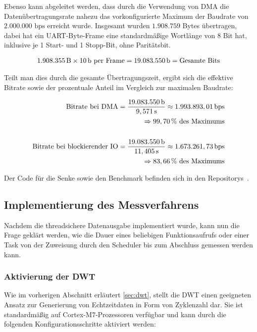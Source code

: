 Ebenso kann abgeleitet werden, dass durch die Verwendung von DMA die
Datenübertragungsrate nahezu das vorkonfigurierte Maximum der Baudrate von
$2.000.000\text{ bps}$ erreicht wurde. Insgesamt wurden $1.908.759$ Bytes
übertragen, dabei hat ein UART-Byte-Frame eine standardmäßige Wortlänge von 8
Bit hat, inklusive je 1 Start- und 1 Stopp-Bit, ohne Paritätsbit.

\begin{align*}
    1.908.355\text{\,B} \times 10\text{\,b per Frame} =
    19.083.550 \text{\,b} = \text{Gesamte Bits}
\end{align*}

Teilt man dies durch die gesamte Übertragungszeit, ergibt sich die effektive
Bitrate sowie der prozentuale Anteil im Vergleich zur maximalen Baudrate:

\begin{align*}
    \text{Bitrate bei DMA} =
    \frac{19.083.550\text{\,b}}{9,571\text{\,s}} \approx
    1.993.893,01 \text{\,bps} \\
    \quad \Rightarrow 99,70\,\%\text{ des Maximums} \\
    \\
    \text{Bitrate bei blockierender IO} =
    \frac{19.083.550\text{\,b}}{11,405\text{\,s}} \approx
    1.673.261,73 \text{\,bps} \\
    \quad \Rightarrow 83,66\,\% \text{ des Maximums}
\end{align*}

Der Code für die Senke sowie den Benchmark befinden sich in den
Repositorys~\cite{freertos_threadsafe_sink, freertos_tsink_benchmark}.

\subsection{Implementierung des Messverfahrens}

Nachdem die threadsichere Datenausgabe implementiert wurde, kann nun die Frage
geklärt werden, wie die Dauer eines beliebigen Funktionsaufrufs oder einer Task
von der Zuweisung durch den Scheduler bis zum Abschluss gemessen werden kann.

\subsubsection{Aktivierung der DWT}

Wie im vorherigen Abschnitt erläutert \ref{sec:dwt}, stellt die DWT einen
geeigneten Ansatz zur Generierung von Echtzeitdaten in Form von Zyklenzahl dar.
Sie ist standardmäßig auf Cortex-M7-Prozessoren verfügbar und kann durch die
folgenden Konfigurationsschritte aktiviert werden:

